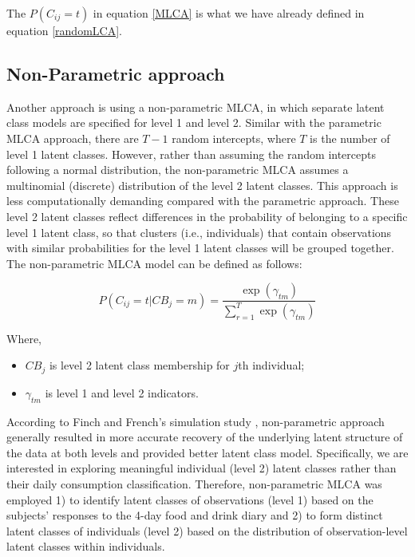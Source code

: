 The $P(C_{ij} = t)$ in equation \ref{MLCA} is what we have already defined in equation \ref{randomLCA}.

\vspace{-0.5cm}
\subsection{Non-Parametric approach}\vspace{-0.3cm}


Another approach is using a non-parametric MLCA, in which separate latent class models are specified for level 1 and level 2. Similar with the parametric MLCA approach, there are $T-1$ random intercepts, where $T$ is the number of level 1 latent classes. However, rather than assuming the random intercepts following a normal distribution, the non-parametric MLCA assumes a multinomial (discrete) distribution of the level 2 latent classes. This approach is less computationally demanding compared with the parametric approach. These level 2 latent
classes reflect differences in the probability of belonging to a specific level 1 latent class, so that clusters (i.e., individuals) that contain observations with similar probabilities for the level 1 latent classes will be grouped together. The non-parametric MLCA model can be defined as follows: \vspace{-0.7cm}

\begin{equation}
P(C_{ij} = t | CB_j = m)  = \frac{\exp(\gamma_{tm})}{\sum_{r=1}^{T}\exp(\gamma_{tm})}
\end{equation}

Where, 

\begin{itemize}
	\item $CB_j$ is level 2 latent class membership for $j$th individual;
	\item $\gamma_{tm}$ is level 1 and level 2 indicators. 
\end{itemize}

According to Finch and French's simulation study \parencite{finch2014multilevel}, non-parametric approach generally resulted in more accurate recovery of the underlying latent structure of the data at both levels and provided better latent class model. Specifically, we are interested in exploring meaningful individual (level 2) latent classes rather than their daily consumption classification. Therefore, non-parametric MLCA was employed 1) to identify latent classes of observations (level 1) based on the subjects' responses to the 4-day food and drink diary and 2) to form distinct latent classes of individuals (level 2) based on the distribution of observation-level latent classes within individuals.\vspace{-0.3cm}
 

